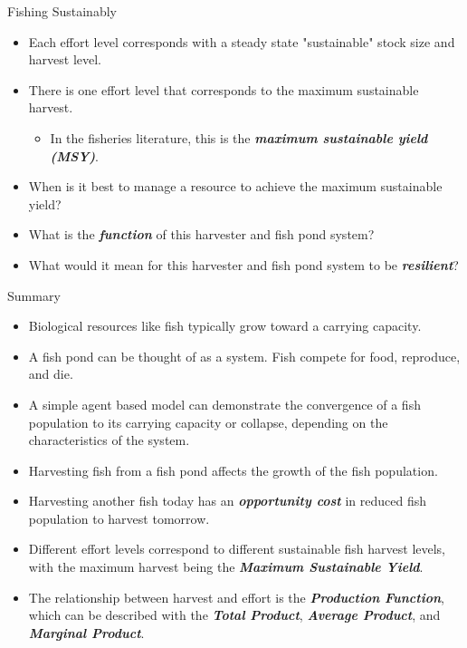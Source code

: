 \begin{frame}{Fishing Sustainably}
	\begin{itemize}
		\item Each effort level corresponds with a steady state "sustainable" stock size and harvest level.
		\item There is one effort level that corresponds to the maximum sustainable harvest.
		\begin{itemize}
			\item In the fisheries literature, this is the \textit{\textbf{maximum sustainable yield (MSY)}}.
		\end{itemize}
		\item When is it best to manage a resource to achieve the maximum sustainable yield?
		\item What is the \textit{\textbf{function}} of this harvester and fish pond system?
		\item What would it mean for this harvester and fish pond system to be \textit{\textbf{resilient}}?
	\end{itemize}
\end{frame}

\begin{frame}{Summary}
	\begin{itemize}
		\item Biological resources like fish typically grow toward a carrying capacity.
		\item A fish pond can be thought of as a system.  Fish compete for food, reproduce, and die.
		\item A simple agent based model can demonstrate the convergence of a fish population to its carrying capacity or collapse, depending on the characteristics of the system.
		\item Harvesting fish from a fish pond affects the growth of the fish population.
		\item Harvesting another fish today has an \textbf{\textit{opportunity cost}} in reduced fish population to harvest tomorrow.
		\item Different effort levels correspond to different sustainable fish harvest levels, with the maximum harvest being the \textbf{\textit{Maximum Sustainable Yield}}.
		\item The relationship between harvest and effort is the \textbf{\textit{Production Function}}, which can be described with the \textbf{\textit{Total Product}}, \textbf{\textit{Average Product}}, and \textbf{\textit{Marginal Product}}.
	\end{itemize}
\end{frame}
